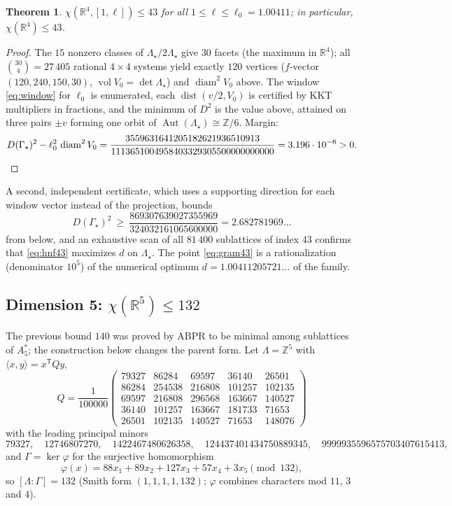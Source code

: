 \documentclass[10pt]{article}
\theoremstyle{plain}
\newtheorem{theorem}{Theorem}[section]
\theoremstyle{remark}
\newcommand{\R}{\mathbb{R}}
\newcommand{\Z}{\mathbb{Z}}
\newcommand{\diam}{\operatorname{diam}}
\newcommand{\dist}{\operatorname{dist}}
\newcommand{\vol}{\operatorname{vol}}
\newcommand{\Aut}{\operatorname{Aut}}
\begin{document}
\begin{theorem}\label{thm:43}
$\chi(\R^4,[1,\ell])\le43$ for all $1\le\ell\le\ell_0=1.00411$; in
particular, $\chi(\R^4)\le43$.
\end{theorem}

\begin{proof}
The $15$ nonzero classes of $\Lambda_\star/2\Lambda_\star$ give $30$ facets
(the maximum in $\R^4$); all $\binom{30}{4}=27\,405$ rational $4\times4$
systems yield exactly $120$ vertices ($f$-vector $(120,240,150,30)$,
$\vol V_0=\det\Lambda_\star$) and $\diam^2V_0$ above. The window
\eqref{eq:window} for $\ell_0$ is enumerated, each $\dist(v/2,V_0)$ is
certified by KKT multipliers in fractions, and the minimum of $D^2$ is the
value above, attained on three pairs $\pm v$ forming one orbit of
$\Aut(\Lambda_\star)\cong\Z/6$. Margin:
\[
D(\Gamma_\star)^2-\ell_0^2\,\diam^2V_0
=\frac{3559631641205182621936510913}{1113651004958403329305500000000000}
=3.196\cdot10^{-6}>0 .
\qedhere
\]
\end{proof}

A second, independent certificate, which uses a supporting direction for
each window vector instead of the projection, bounds
\[
D(\Gamma_\star)^2\ \ge\ \frac{869307639027355969}{324032161065600000}
=2.682781969\ldots
\]
from below, and an exhaustive scan of all $81\,400$ sublattices of index
$43$ confirms that \eqref{eq:hnf43} maximizes $d$ on $\Lambda_\star$. The
point \eqref{eq:gram43} is a rationalization (denominator $10^5$) of the
numerical optimum $d=1.00411205721\ldots$ of the family.

\subsection{Dimension 5: $\chi(\R^5)\le132$}\label{ssec:132}

The previous bound $140$ was proved by ABPR to be minimal among sublattices
of $A_5^*$; the construction below changes the parent form. Let
$\Lambda=\Z^5$ with $\langle x,y\rangle=x^{\mathsf T}Qy$,
\[
Q=\frac1{100000}
\begin{pmatrix}
79327&86284&69597&36140&26501\\
86284&254538&216808&101257&102135\\
69597&216808&296568&163667&140527\\
36140&101257&163667&181733&71653\\
26501&102135&140527&71653&148076
\end{pmatrix}
\]
with the leading principal minors
\[
79327,\quad 12746807270,\quad 1422467480626358,\quad
124437401434750889345,\quad 9999935596575703407615413,
\]
and $\Gamma=\ker\varphi$ for the surjective homomorphism
\[
\varphi(x)=88x_1+89x_2+127x_3+57x_4+3x_5\pmod{132},
\]
so $[\Lambda:\Gamma]=132$ (Smith form $(1,1,1,1,132)$; $\varphi$ combines
characters mod $11$, $3$ and $4$).
\end{document}
